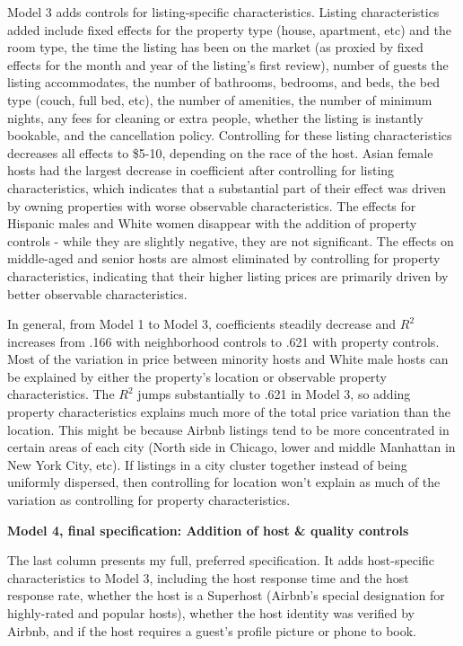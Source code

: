 \documentclass[11pt, oneside]{article}
\begin{document}
Model 3 adds controls for listing-specific characteristics. Listing characteristics added include fixed effects for the property type (house, apartment, etc) and the room type, the time the listing has been on the market (as proxied by fixed effects for the month and year of the listing's first review), number of guests the listing accommodates, the number of bathrooms, bedrooms, and beds, the bed type (couch, full bed, etc), the number of amenities, the number of minimum nights, any fees for cleaning or extra people, whether the listing is instantly bookable, and the cancellation policy. Controlling for these listing characteristics decreases all effects to \$5-10, depending on the race of the host. Asian female hosts had the largest decrease in coefficient after controlling for listing characteristics, which indicates that a substantial part of their effect was driven by owning properties with worse observable characteristics. The effects for Hispanic males and White women disappear with the addition of property controls - while they are slightly negative, they are not significant. The effects on middle-aged and senior hosts are almost eliminated by controlling for property characteristics, indicating that their higher listing prices are primarily driven by better observable characteristics. 

In general, from Model 1 to Model 3, coefficients steadily decrease and $R^2$ increases from .166 with neighborhood controls to .621 with property controls. Most of the variation in price between minority hosts and White male hosts can be explained by either the property's location or observable property characteristics. The $R^2$ jumps substantially to .621 in Model 3, so adding property characteristics explains much more of the total price variation than the location. This might be because Airbnb listings tend to be more concentrated in certain areas of each city (North side in Chicago, lower and middle Manhattan in New York City, etc). If listings in a city cluster together instead of being uniformly dispersed, then controlling for location won't explain as much of the variation as controlling for property characteristics.   

\textbf{Model 4, final specification: Addition of host \& quality controls}

The last column presents my full, preferred specification. It adds host-specific characteristics to Model 3, including the host response time and the host response rate, whether the host is a Superhost (Airbnb's special designation for highly-rated and popular hosts), whether the host identity was verified by Airbnb, and if the host requires a guest's profile picture or phone to book. 
\end{document}
